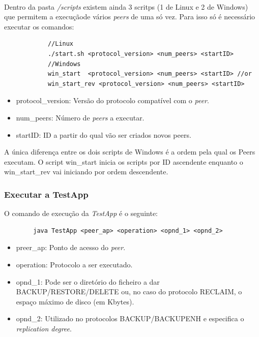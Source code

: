 \documentclass[11pt,oneside]{book}
\begin{document}
    \paragraph{}
        Dentro da pasta \textit{/scripts} existem ainda 3 scritps (1 de Linux e 2 de Windows) que
        permitem a execuçãode vários \textit{peers} de uma só vez. Para isso só é necessário
        executar os comandos:
        \begin{lstlisting}
            //Linux
            ./start.sh <protocol_version> <num_peers> <startID>
            //Windows
            win_start  <protocol_version> <num_peers> <startID> //or
            win_start_rev <protocol_version> <num_peers> <startID>
        \end{lstlisting}
        \begin{itemize}
            \item protocol\_version: Versão do protocolo compatível com o \textit{peer}.
            \item num\_peers: Número de \textit{peers} a executar.
            \item startID: ID a partir do qual vão ser criados novos peers.
        \end{itemize}
        A única diferença entre os dois scripts de Windows é a ordem pela qual os Peers
        executam. O script win\_start inicia os scripts por ID ascendente enquanto o 
        win\_start\_rev vai iniciando por ordem descendente.
    
    \subsubsection{Executar a TestApp}
    O comando de execução da \textit{TestApp} é o seguinte:
    \begin{lstlisting}
        java TestApp <peer_ap> <operation> <opnd_1> <opnd_2> 
    \end{lstlisting}
    \begin{itemize}
        \item preer\_ap: Ponto de acesso do \textit{peer}.
        \item operation: Protocolo a ser executado.
        \item opnd\_1: Pode ser o diretório do ficheiro a dar BACKUP/RESTORE/DELETE ou,
        no caso do protocolo RECLAIM, o espaço máximo de disco (em Kbytes).
        \item opnd\_2: Utilizado no protocolos BACKUP/BACKUPENH e especifica o
        \textit{replication degree}.
    \end{itemize}
\end{document}
